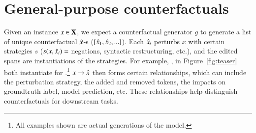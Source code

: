 \section{General-purpose counterfactuals}

% 
Given an instance $x \in \mathbf{X}$, we expect a counterfactual generator $g$ to generate a list of unique counterfactual $\hat{x}$-s ($[\hat{x}_1, \hat{x}_2, ...]$).
Each $\hat{x}_i$ perturbs $x$ with certain strategies $s$ ($s(x, \hat{x}_i)=$ negations, syntactic restructuring, etc.), and the edited spans are instantiations of the strategies.
For example, ,  in Figure~\ref{fig:teaser} both instantiate for .\footnote{All examples shown are actual generations of the model. }
$x\rightarrow \hat{x}$ then forms certain relationships, which can include the perturbation strategy, the added and removed tokens, the impacts on groundtruth label, model prediction, etc.
These relationships help distinguish counterfactuals for downstream tasks.

